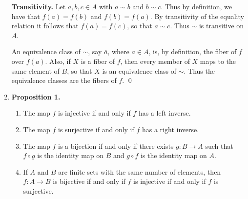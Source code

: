 \begin{enumerate}
      \textbf{Transitivity.} Let $a, b, c \in A$ with $a \sim b$ and $b \sim c$.
      Thus by definition, we have that $f(a) = f(b)$ and $f(b) = f(a)$. By
      transitivity of the equality relation it follows that $f(a) = f(c)$, so 
      that $a \sim c$. Thus $\sim$ is transitive on $A$.


      An equivalence class of $\sim$, say $\overline{a}$, where $a \in A$, is,
      by definition, the fiber of $f$ over $f(a)$. Also, if $X$ is a fiber of
      $f$, then every member of $X$ maps to the same element of $B$, so that $X$
      is an equivalence class of $\sim$. Thus the equivalence classes are the 
      fibers of $f$. \qed
   \item[0.1.8] \textbf{Proposition 1.}
                \begin{enumerate}
                   \item The map $f$ is injective if and only if $f$ has a left
                         inverse.
                   \item The map $f$ is surjective if and only if $f$ has a
                         right inverse.
                   \item The map $f$ is a bijection if and only if there exists
                         $g : B \rightarrow A$ such that $f \circ g$ is the
                         identity map on $B$ and $g \circ f$ is the identity map
                         on $A$.
                   \item If $A$ and $B$ are finite sets with the same number of
                         elements, then $f : A \rightarrow B$ is bijective if
                         and only if $f$ is injective if and only if $f$ is
                         surjective.
                \end{enumerate}


\end{enumerate}
